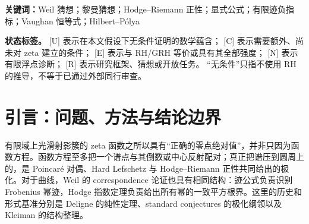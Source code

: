 \documentclass[UTF8,11pt,a4paper]{ctexart}
\theoremstyle{definition}
\theoremstyle{remark}
\newcommand{\1}{\mathbf 1}
\newcommand{\statusU}{\textnormal{[U]}}
\newcommand{\statusC}{\textnormal{[C]}}
\newcommand{\statusE}{\textnormal{[E]}}
\newcommand{\statusN}{\textnormal{[N]}}
\newcommand{\statusR}{\textnormal{[R]}}
\begin{document}
\begin{abstract}
进一步地，negative part具有 exact reciprocal-barrier变分式；任意正背景的倒数会生成新的 positive-definite correspondence kernel。由 threshold-complex harmonic currents形成的有限 predictor在该 kernel下可作 amplitude-certified Schur shorting，从而把 full quadratic energy替换为相对正 Hodge background的 one-sided residual。

本文再以 sharp square completion 删除该 pointwise amplitude 前提：加入最小二次 Hodge lift 后，背景自动保持正性，负指标由 Schur residual的 reciprocal二阶矩与 predictor的 reciprocal-cubic四阶矩控制；后者仍是显式 positive-definite correspondence Gram。平方根楔中的下一输入因而成为一条 integrated fourth-moment budget，而非 $L^\infty$ leverage。

进一步的 quartic-capacity下界表明，上述 unscaled fourth price在 zeta shell上至少为 $TD_T^2/\log T$，故它未必是较弱输入。本文于是把 reciprocal-barrier upper bound提升到不要求对易的 finite von Neumann algebra，并用 relative continuous functional calculus对 explicit predictor作 lattice clipping。所得严格正背景仅支付 one-sided quadratic clipped residual；它既不需要 pointwise leverage，也不需要 fourth moment。

因此，本文没有证明 RH 或 GRH；它给出的是若干已证明的结构蕴含、明确标注的条件框架、存在性边界、失败机制，以及一个缩窄到具体算术不等式的下一阶段研究议程。所有内部新结果仍有待独立同行核验。
\end{abstract}

\noindent\textbf{关键词：}Weil 猜想；黎曼猜想；Hodge--Riemann 正性；显式公式；有限迹负指标；Vaughan 恒等式；Hilbert--Pólya

\medskip
\noindent\textbf{状态标签。}
\statusU{} 表示在本文假设下无条件证明的数学蕴含；
\statusC{} 表示需要额外、尚未对 zeta 建立的条件；
\statusE{} 表示与 RH/GRH 等价或具有其全部强度；
\statusN{} 表示有限浮点诊断；
\statusR{} 表示研究框架、猜想或开放任务。
“无条件”只指不使用 RH 的推导，不等于已通过外部同行审查。

\tableofcontents

\section{引言：问题、方法与结论边界}

有限域上光滑射影簇的 zeta 函数之所以具有“正确的零点绝对值”，并非只因为函数方程。函数方程至多把一个谱点与其倒数或中心反射配对；真正把谱压到圆周上的，是 Poincar\'e 对偶、Hard Lefschetz 与 Hodge--Riemann 正性共同给出的极化。对于曲线，Weil 的 correspondence 论证也具有相同结构：迹公式负责识别 Frobenius 幂迹，Hodge 指数定理负责给出所有幂的一致平方根界。这里的历史和形式基准分别是 Deligne 的纯性定理、standard conjectures 的极化纲领以及 Kleiman 的结构整理\cite{Deligne1974,GrothendieckStandard,KleimanWeil}。
\end{document}
